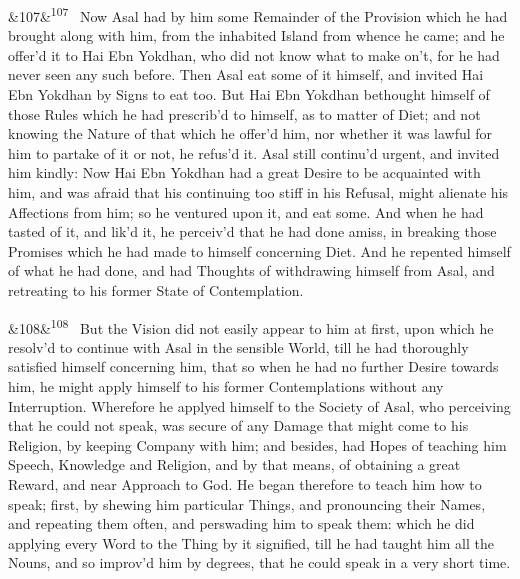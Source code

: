 \documentclass[12pt]{article}
\newcommand{\para}[1][]{\par\noindent\ifx&#1&\else\textsuperscript{\footnotesize #1}~\fi}
\begin{document}
\para[107] Now Asal had by him some Remainder of the Provision which he had brought along with him, from the inhabited Island from whence he came; and he offer'd it to Hai Ebn Yokdhan, who did not know what to make on't, for he had never seen any such before. Then Asal eat some of it himself, and invited Hai Ebn Yokdhan by Signs to eat too. But Hai Ebn Yokdhan bethought himself of those Rules which he had prescrib'd to himself, as to matter of Diet; and not knowing the Nature of that which he offer'd him, nor whether it was lawful for him to partake of it or not, he refus'd it. Asal still continu'd urgent, and invited him kindly: Now Hai Ebn Yokdhan had a great Desire to be acquainted with him, and was afraid that his continuing too stiff in his Refusal, might alienate his Affections from him; so he ventured upon it, and eat some. And when he had tasted of it, and lik'd it, he perceiv'd that he had done amiss, in breaking those Promises which he had made to himself concerning Diet. And he repented himself of what he had done, and had Thoughts of withdrawing himself from Asal, and retreating to his former State of Contemplation.

\para[108] But the Vision did not easily appear to him at first, upon which he resolv'd to continue with Asal in the sensible World, till he had thoroughly satisfied himself concerning him, that so when he had no further Desire towards him, he might apply himself to his former Contemplations without any Interruption. Wherefore he applyed himself to the Society of Asal, who perceiving that he could not speak, was secure of any Damage that might come to his Religion, by keeping Company with him; and besides, had Hopes of teaching him Speech, Knowledge and Religion, and by that means, of obtaining a great Reward, and near Approach to God. He began therefore to teach him how to speak; first, by shewing him particular Things, and pronouncing their Names, and repeating them often, and perswading him to speak them: which he did applying every Word to the Thing by it signified, till he had taught him all the Nouns, and so improv'd him by degrees, that he could speak in a very short time.
\end{document}

